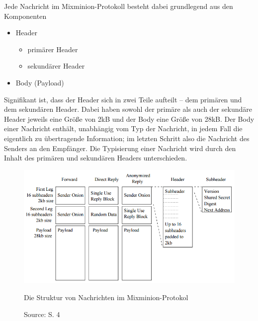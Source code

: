 Jede Nachricht im Mixminion-Protokoll besteht dabei grundlegend aus den Komponenten 
\begin{itemize}
\item Header
	\begin{itemize}
	\item primärer Header
	\item sekundärer Header
	\end{itemize}
\item Body (Payload)
\end{itemize}

Signifikant ist, dass der Header sich in zwei Teile aufteilt -- dem primären und dem sekundären Header. Dabei haben sowohl der primäre als auch der sekundäre Header jeweils eine Größe von 2kB und der Body eine Größe von 28kB. Der Body einer Nachricht enthält, unabhängig vom Typ der Nachricht, in jedem Fall die eigentlich zu übertragende Information; im letzten Schritt also die Nachricht des Senders an den Empfänger. Die Typisierung einer Nachricht wird durch den Inhalt des primären und sekundären Headers unterschieden.

\begin{figure}
	\begin{center}
		\def\svgwidth{0.9 \linewidth}
		\includegraphics[width = 0.9 \linewidth]{bilder/mixminion_structure.png}
		\caption{Die Struktur von Nachrichten im Mixminion-Protokol}
		\caption*{\hfill Source: S. 4 \cite{mixminion}}
	\end{center}
\end{figure}

